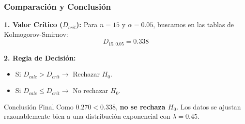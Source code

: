 \documentclass[aspectratio=1610, 10pt]{beamer}
\begin{document}
\begin{frame}
\frametitle{Comparación y Conclusión}


\vspace{0.2cm}
\textbf{1. Valor Crítico ($D_{crit}$):}
Para $n=15$ y $\alpha=0.05$, buscamos en las tablas de Kolmogorov-Smirnov:
$$D_{15, 0.05} = \mathbf{0.338}$$

\vspace{0.2cm}
\textbf{2. Regla de Decisión:}
\begin{itemize}
    \item Si $D_{calc} > D_{crit} \rightarrow$ Rechazar $H_0$.
    \item Si $D_{calc} \leq D_{crit} \rightarrow$ No rechazar $H_0$.
\end{itemize}

\vspace{0.2cm}
\begin{block}{Conclusión Final}
Como $0.270 < 0.338$, \textbf{no se rechaza $H_0$}. Los datos se ajustan razonablemente bien a una distribución exponencial con $\lambda=0.45$.
\end{block}
\end{frame}
\end{document}
